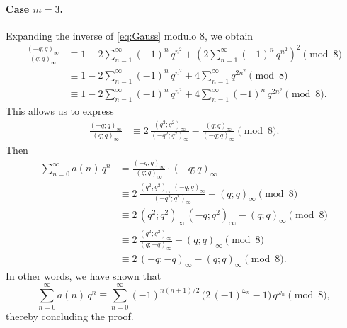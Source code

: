 \documentclass{article}
\begin{document}
    \paragraph{Case $m=3$.} Expanding the inverse of \eqref{eq:Gauss} modulo $8$, we obtain
    \begin{align*}
        \frac{(-q;q)_\infty}{(q;q)_\infty} 
        & \equiv 1-2\sum_{n=1}^\infty (-1)^n\,q^{n^2} + \left( 2\sum_{n=1}^\infty (-1)^n\,q^{n^2} \right)^2  \pmod 8 \\
        & \equiv 1-2\sum_{n=1}^\infty (-1)^n\,q^{n^2} +4 \sum_{n=1}^\infty q^{2n^2} \pmod 8 \\
        & \equiv 1-2\sum_{n=1}^\infty (-1)^n\,q^{n^2} +4 \sum_{n=1}^\infty (-1)^n\,q^{2n^2} \pmod 8.
    \end{align*}
    This allows us to express
    \begin{align*}
         \frac{(-q;q)_\infty}{(q;q)_\infty} 
         & \equiv 2\,\frac{(q^2;q^2)_\infty}{(-q^2;q^2)_\infty} - \frac{(q;q)_\infty}{(-q;q)_\infty} \pmod 8.
    \end{align*}
    Then
    \begin{align*}
        \sum_{n=0}^\infty a(n)\,q^n 
        &= \frac{(-q;q)_\infty}{(q;q)_\infty}\cdot (-q;q)_\infty \\
        & \equiv 2\,\frac{(q^2;q^2)_\infty\,(-q;q)_\infty}{(-q^2;q^2)_\infty} - (q;q)_\infty \pmod 8\\
        & \equiv 2\,(q^2;q^2)_\infty\,(-q;q^2)_\infty - (q;q)_\infty \pmod 8\\
        & \equiv 2\,\frac{(q^2;q^2)_\infty}{(q;-q)_\infty} - (q;q)_\infty \pmod 8\\
        & \equiv 2\,(-q;-q)_\infty- (q;q)_\infty \pmod 8.
    \end{align*}
In other words, we have shown that
$$
\sum_{n=0}^\infty a(n)\, q^n \equiv \sum_{n=0}^\infty  (-1)^{n(n+1)/2}\,\big(2\,(-1)^{\omega_n} - 1 \big)\, q^{\omega_n} \pmod{8},
$$
thereby concluding the proof.
    
\end{document}
